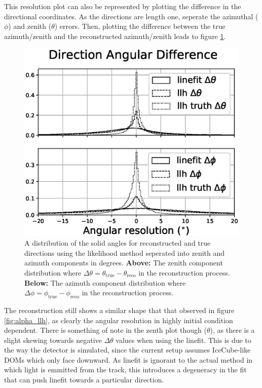 This resolution plot can also be represented by plotting the difference in the directional coordinates. As the directions are length one, seperate the azimuthal ($\phi$) and zenith ($\theta$) errors. Then, plotting the difference between the true azimuth/zenith and the reconstructed azimuth/zenith leads to figure \ref{fig:alpha_llh_sep}. 

\begin{figure}[H]
  \centering
  \includegraphics[width=12cm]{./Figures/reco_plots/angular_diff_dir.eps}
  \caption{A distribution of the solid angles for reconstructed and true directions using the likelihood method seperated into zenith and azimuth components in degrees. \textbf{Above:} The zenith component distribution where $\Delta\theta = \theta_{\text{true}} - \theta_{\text{reco}}$ in the reconstruction process. \textbf{Below:} The azimuth component distribution where $\Delta\phi = \phi_{\text{true}} - \phi_{\text{reco}}$ in the reconstruction process.}
  \label{fig:alpha_llh_sep}
\end{figure}

The reconstruction still shows a similar shape that that observed in figure \ref{fig:alpha_llh}, as clearly the angular resolution in highly initial condition dependent. There is something of note in the zenth plot though ($\theta$), as there is a slight skewing towards negative $\Delta\theta$ values when using the linefit. This is due to the way the detector is simulated, since the current setup assumes IceCube-like DOMs which only face downward. As linefit is ignorant to the actual method in which light is emmitted from the track, this introduces a degeneracy in the fit that can push linefit towards a particular direction.

